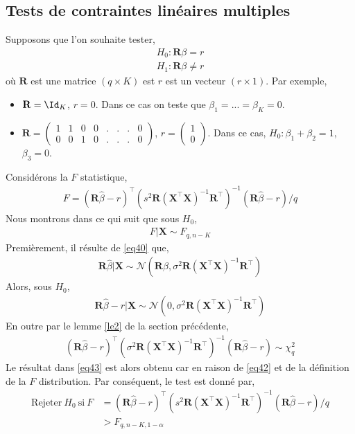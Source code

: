 \subsection{Tests de contraintes linéaires multiples}
Supposons que l'on souhaite tester,
\begin{align*}
H_0: \mathbf{R}\beta = r\\
H_1: \mathbf{R}\beta \neq r
\end{align*}
où $\mathbf{R}$ est une matrice $(q \times K)$ est $r$ est un vecteur $(r\times 1)$. Par exemple, 
\begin{itemize}
\item $\mathbf{R} = \Id_K$, $r=0$. Dans ce cas on teste que $\beta_1=...=\beta_K=0$.
\item $\mathbf{R} = \left(
\begin{array}{cccccccc}
1&1&0&0&.&.&.&0\\
0&0&1&0&.&.&.&0
\end{array}
\right)$, $r = \left(\begin{array}{c}
1\\
0
\end{array}
\right)
$. Dans ce cas, $H_0: \beta_1 + \beta_2 = 1$, $\beta_3=0$.
\end{itemize}
Considérons la $F$ statistique,
\begin{align*}
F = \left(\mathbf{R}\widehat{\beta} - r\right)^\top\left(s^2\mathbf{R}(\mathbf{X}^\top\mathbf{X})^{-1}\mathbf{R}^\top\right)^{-1}\left(\mathbf{R}\widehat{\beta} - r\right)/q
\end{align*}
Nous montrons dans ce qui suit que sous $H_0$,
\begin{align}
F | \mathbf{X} \sim F_{q, n-K}
\label{eq43}
\end{align}
Premièrement, il résulte de \eqref{eq40} que,
\begin{align*}
\mathbf{R}\widehat{\beta} | \mathbf{X} \sim\mathcal{N}\left(\mathbf{R}\beta, \sigma^2\mathbf{R}(\mathbf{X}^\top\mathbf{X})^{-1}\mathbf{R}^\top\right)
\end{align*}
Alors, sous $H_0$,
\begin{align*}
\mathbf{R}\widehat{\beta} - r | \mathbf{X} \sim\mathcal{N}\left(0, \sigma^2\mathbf{R}(\mathbf{X}^\top\mathbf{X})^{-1}\mathbf{R}^\top\right)
\end{align*}
En outre par le lemme \eqref{le2} de la section précédente,
\begin{align*}
\left(\mathbf{R}\widehat{\beta} - r\right)^\top\left(\sigma^2\mathbf{R}(\mathbf{X}^\top\mathbf{X})^{-1}\mathbf{R}^\top\right)^{-1}\left(\mathbf{R}\widehat{\beta} - r\right)\sim\chi^2_q
\end{align*}
Le résultat dans \eqref{eq43} est alors obtenu car en raison de \eqref{eq42} et de la définition de la $F$ distribution. Par conséquent, le test est donné par,
\begin{align*}
\textrm{Rejeter} \ H_0 \ \textrm{si} \ F &= \left(\mathbf{R}\widehat{\beta} - r\right)^\top\left(s^2\mathbf{R}(\mathbf{X}^\top\mathbf{X})^{-1}\mathbf{R}^\top\right)^{-1}\left(\mathbf{R}\widehat{\beta} - r\right)/q\\
&> F_{q, n-K, 1-\alpha} 
\end{align*}

